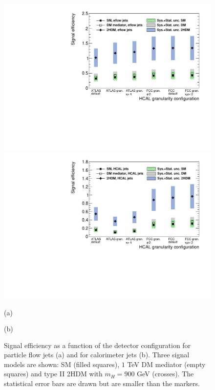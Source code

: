 \begin{figure}
	\centering
	\begin{minipage}{.5\textwidth}
		\centering
		\includegraphics[trim={.6cm 0 0 0},clip,width=\linewidth]{./Figures/EffvsGran_PFjets.pdf}
	\end{minipage}%
	\begin{minipage}{.5\textwidth}
		\centering
		\includegraphics[trim={0 0 .6cm 0},clip,width=\linewidth]{./Figures/EffvsGran_CALOjets.pdf}
	\end{minipage}
	\begin{minipage}[t]{0.5\textwidth}
		\caption*{(a)}
	\end{minipage}%
	\hfill
	\begin{minipage}[t]{0.5\textwidth}
		\caption*{(b)}
	\end{minipage}
	\caption{Signal efficiency as a function of the detector configuration for particle flow jets (a) and for calorimeter jets (b). Three signal models are shown: SM (filled squares), $1$ TeV DM mediator (empty squares) and type II 2HDM with $m_H=900$ GeV (crosses). The statistical error bars are drawn but are smaller than the markers.}
	\label{fig:EffvsGran}
\end{figure}

